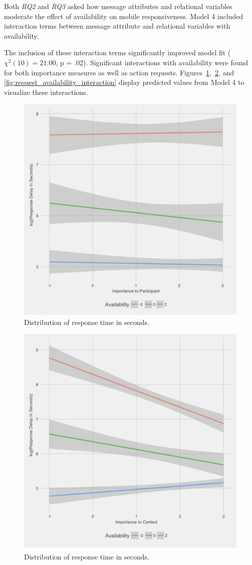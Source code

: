 \documentclass[12pt]{nuthesis}	%
\begin{document}
Both \textit{RQ2} and \textit{RQ3} asked how message attributes and relational variables moderate the effect of availability on mobile responsiveness. Model 4 included interaction terms between message attribute and relational variables with availability.

The inclusion of these interaction terms significantly improved model fit ($\chi^2(10) = 21.00$, p = .02). Significant interactions with availability were found for both importance measures as well as action requests. Figures~\ref{fig:importance_availability_interaction},~\ref{fig:importance_contact_availability_interaction}, and \ref{fig:request_availability_interaction} display predicted values from Model 4 to visualize these interactions.

\begin{figure}[h]
\centering
\includegraphics[width=.7\textwidth]{figures/importance_availability_interaction}
\caption{Distribution of response time in seconds.}
\label{fig:importance_availability_interaction}
\end{figure}

\begin{figure}[h]
\centering
\includegraphics[width=.7\textwidth]{figures/importance_contact_availability_interaction}
\caption{Distribution of response time in seconds.}
\label{fig:importance_contact_availability_interaction}
\end{figure}
\end{document}
